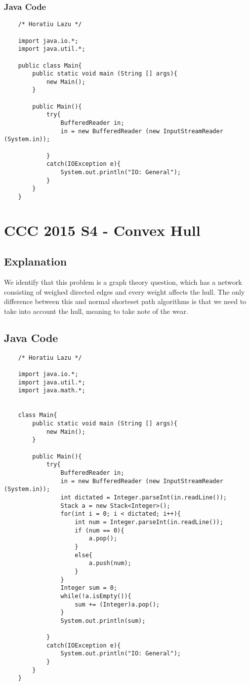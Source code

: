 \documentclass[52pt]{article}
\begin{document}
	\subsubsection {Java Code}
	\begin{lstlisting}
	/* Horatiu Lazu */

	import java.io.*;
	import java.util.*;

	public class Main{
		public static void main (String [] args){
			new Main();
		}
		
		public Main(){
			try{
				BufferedReader in;
				in = new BufferedReader (new InputStreamReader (System.in));
				
			}
			catch(IOException e){
				System.out.println("IO: General");
			}
		}
	}
	\end{lstlisting}

	\newpage
	\section {CCC 2015 S4 - Convex Hull}
	\subsection {Explanation}
	
	We identify that this problem is a graph theory question, which has a network consisting of weighed directed edges and every weight affects the hull. The only difference between this and normal shorteset path algorithms is that we need to take into account the hull, meaning to take note of the wear.
	\subsection {Java Code}
	\begin{lstlisting}
	/* Horatiu Lazu */

	import java.io.*;
	import java.util.*;
	import java.math.*;


	class Main{
		public static void main (String [] args){
			new Main();
		}

		public Main(){
			try{
				BufferedReader in;
				in = new BufferedReader (new InputStreamReader (System.in));
				int dictated = Integer.parseInt(in.readLine());
				Stack a = new Stack<Integer>();
				for(int i = 0; i < dictated; i++){
					int num = Integer.parseInt(in.readLine());
					if (num == 0){
						a.pop();	
					}
					else{
						a.push(num);	
					}
				}
				Integer sum = 0;
				while(!a.isEmpty()){
					sum += (Integer)a.pop();
				}
				System.out.println(sum);
				
			}
			catch(IOException e){
				System.out.println("IO: General");
			}
		}
	}
	\end{lstlisting}
	\newpage
\end{document}
